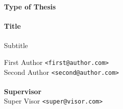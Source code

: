 \documentclass[a4paper,oneside]{memoir}
\begin{document}
    \thispagestyle{empty}
    \begin{adjustwidth}{-3cm}{-1.5cm}
    \vspace*{-1cm}
    \textbf{\Huge Type of Thesis} \\
    \vspace*{2.5cm} \\
    \textbf{\Huge Title} \\
    \vspace*{.1cm} \\
    {\huge Subtitle} \\
    \begin{tabbing}
    First Author \hspace{1cm} \= \texttt{<first@author.com>} \\
    Second Author \> \texttt{<second@author.com>} \\
    \\[12cm]
    \textbf{\Large Supervisor} \\
    Super Visor \> \texttt{<super@visor.com>} \\
    \end{tabbing}
    \end{adjustwidth}
    \newpage
    \ClearWallPaper
\end{document}
